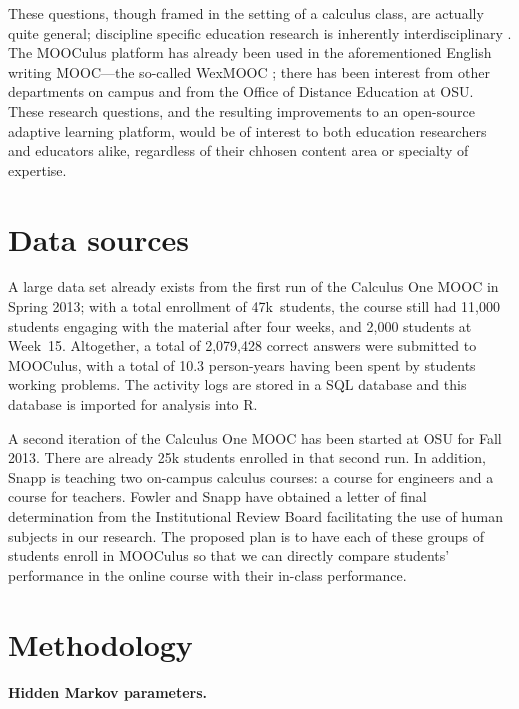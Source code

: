 \documentclass[12pt]{article}
\begin{document}
These questions, though framed in the setting of a calculus class, are
actually quite general; discipline specific education research is
inherently interdisciplinary \cite{dber-report}.  The MOOCulus
platform has already been used in the aforementioned English writing
MOOC---the so-called WexMOOC \parencite{gates-foundation-grant}; there
has been interest from other departments on campus and from the Office
of Distance Education at OSU.  These research questions, and the
resulting improvements to an open-source adaptive learning platform,
would be of interest to both education researchers and educators
alike, regardless of their chhosen content area or specialty of
expertise.

\section{Data sources}

A large data set already exists from the first run of the Calculus One
MOOC in Spring 2013; with a total enrollment of 47k~students, the
course still had 11,000 students engaging with the material after four
weeks, and 2,000 students at Week~15.  Altogether, a total of
2,079,428 correct answers were submitted to MOOCulus, with a total of
10.3 person-years having been spent by students working problems.  The
activity logs are stored in a SQL database and this database is
imported for analysis into R.

A second iteration of the Calculus One MOOC has been started at OSU
for Fall 2013.  There are already 25k students enrolled in that second
run.  In addition, Snapp is teaching two on-campus calculus courses: a
course for engineers and a course for teachers.  Fowler and Snapp have
obtained a letter of final determination from the Institutional Review
Board facilitating the use of human subjects in our research.  The
proposed plan is to have each of these groups of students enroll in
MOOCulus so that we can directly compare students' performance in the
online course with their in-class performance.

\section{Methodology}

\paragraph{Hidden Markov parameters.}
\end{document}
